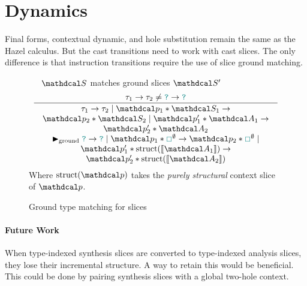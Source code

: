 \section{Dynamics}
Final forms, contextual dynamic, and hole substitution remain the same as the Hazel calculus. But the cast transitions need to work with cast slices. The only difference is that instruction transitions require the use of slice ground matching.

\begin{figure}[H]
\ \ \ $\S$ matches ground slices $\S'$
\[\inference[\tiny]{\tau_1 \to \tau_2 \neq \dyn \to \dyn}{\parbox{0.8\textwidth}{\centering$\tau_1 \to \tau_2 \mid \p_1 * \S_1 \to \p_2 * \S_2 \mid \p_1' * \A_1 \to \p_2' * \A_2$ \\ $\groundmatch \dyn \to \dyn \mid \p_1 * \gap^\emptyset \to \p_2 * \gap^\emptyset \mid \p_1' * \mathrm{struct}(\type{\A_1}) \to \p_2' * \mathrm{struct}(\type{\A_2})$}}\]
Where $\mathrm{struct}(\p)$ takes the \textit{purely structural} context slice of $\p$.
\caption{Ground type matching for slices}
\label{fig:groundmatch}
\end{figure}
\paragraph{Future Work} When type-indexed synthesis slices are converted to type-indexed analysis slices, they lose their incremental structure. A way to retain this would be beneficial. This could be done by pairing synthesis slices with a global two-hole context.